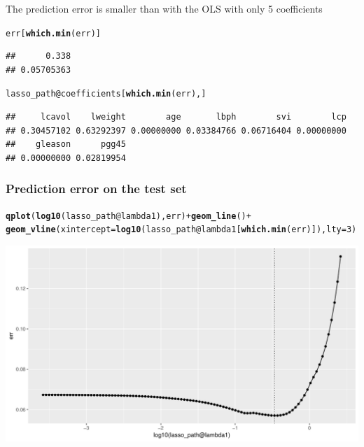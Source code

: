 \documentclass{beamer}\usepackage[]{graphicx}\usepackage[]{color}
\makeatletter
\newcommand{\hlnum}[1]{\textcolor[rgb]{0.686,0.059,0.569}{#1}}%
\newcommand{\hlopt}[1]{\textcolor[rgb]{0,0,0}{#1}}%
\newcommand{\hlstd}[1]{\textcolor[rgb]{0.345,0.345,0.345}{#1}}%
\newcommand{\hlkwc}[1]{\textcolor[rgb]{0.333,0.667,0.333}{#1}}%
\newcommand{\hlkwd}[1]{\textcolor[rgb]{0.737,0.353,0.396}{\textbf{#1}}}%
\newenvironment{kframe}{%
 \def\at@end@of@kframe{}%
 \ifinner\ifhmode%
  \def\at@end@of@kframe{\end{minipage}}%
  \begin{minipage}{\columnwidth}%
 \fi\fi%
 \def\FrameCommand##1{\hskip\@totalleftmargin \hskip-\fboxsep
 \colorbox{shadecolor}{##1}\hskip-\fboxsep
     \hskip-\linewidth \hskip-\@totalleftmargin \hskip\columnwidth}%
 \MakeFramed {\advance\hsize-\width
   \@totalleftmargin\z@ \linewidth\hsize
   \@setminipage}}%
 {\par\unskip\endMakeFramed%
 \at@end@of@kframe}
\newenvironment{knitrout}{}{} %
\makeatother
\begin{document}
\begin{frame}
The prediction error is smaller than with the OLS with only 5 coefficients
\begin{knitrout}\scriptsize
{}\color{fgcolor}\begin{kframe}
\begin{alltt}
\hlstd{err[}\hlkwd{which.min}\hlstd{(err)]}
\end{alltt}
\begin{verbatim}
##      0.338 
## 0.05705363
\end{verbatim}
\begin{alltt}
\hlstd{lasso_path}\hlopt{@}\hlkwc{coefficients}\hlstd{[}\hlkwd{which.min}\hlstd{(err), ]}
\end{alltt}
\begin{verbatim}
##     lcavol    lweight        age       lbph        svi        lcp 
## 0.30457102 0.63292397 0.00000000 0.03384766 0.06716404 0.00000000 
##    gleason      pgg45 
## 0.00000000 0.02819954
\end{verbatim}
\end{kframe}
\end{knitrout}

\end{frame}

\begin{frame}[containsverbatim]
  \frametitle{Prediction error on the test set}

\begin{knitrout}\scriptsize
{}\color{fgcolor}\begin{kframe}
\begin{alltt}
\hlkwd{qplot}\hlstd{(}\hlkwd{log10}\hlstd{(lasso_path}\hlopt{@}\hlkwc{lambda1}\hlstd{), err)} \hlopt{+} \hlkwd{geom_line}\hlstd{()} \hlopt{+}
\hlkwd{geom_vline}\hlstd{(}\hlkwc{xintercept} \hlstd{=} \hlkwd{log10}\hlstd{(lasso_path}\hlopt{@}\hlkwc{lambda1}\hlstd{[}\hlkwd{which.min}\hlstd{(err)]),} \hlkwc{lty}\hlstd{=}\hlnum{3}\hlstd{)}
\end{alltt}
\end{kframe}
\includegraphics[width=.8\textwidth]{figures/unnamed-chunk-29-1} 

\end{knitrout}
\end{frame}
\end{document}
